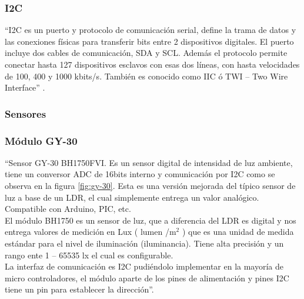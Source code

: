 

\subsubsection{I2C}

``I2C es un puerto y protocolo de comunicación serial, define la trama de datos y las conexiones físicas para transferir bits entre 2 dispositivos digitales. El puerto incluye dos cables de comunicación, SDA y SCL. Además el protocolo permite conectar hasta 127 dispositivos esclavos con esas dos líneas, con hasta velocidades de 100, 400 y 1000 kbits/s. También es conocido como IIC ó TWI – Two Wire Interface'' \cite{I2C}.

\subsubsection{Sensores}

\subsubsection{Módulo GY-30}

``Sensor GY-30 BH1750FVI. Es un sensor digital de intensidad de luz ambiente, tiene un conversor ADC de 16bits interno y comunicación por I2C como se observa en la figura \ref{fig:gy-30}. Esta es una versión mejorada del típico sensor de luz a base de un LDR, el cual simplemente entrega un valor analógico. Compatible con Arduino, PIC, etc. \\

El módulo BH1750 es un sensor de luz, que a diferencia del LDR es digital y nos entrega valores de medición en Lux ( lumen /m$^2$ ) que es una  unidad de medida estándar para el nivel de iluminación (iluminancia). Tiene alta precisión y un rango ente 1 – 65535 lx el cual es configurable.\\

La interfaz de comunicación es I2C pudiéndolo implementar en la mayoría de micro controladores, el módulo aparte de los pines de alimentación y pines I2C tiene un pin para establecer la dirección''.\cite{GY30}


